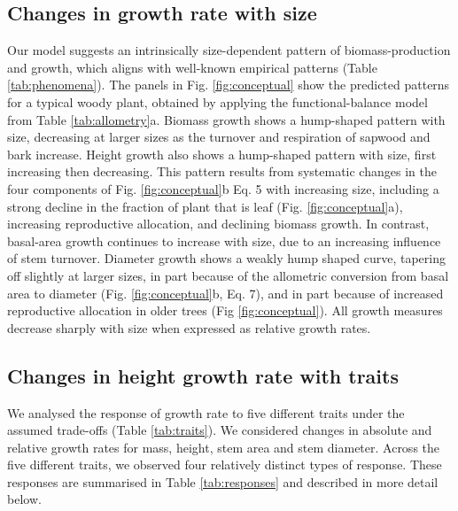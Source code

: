 \documentclass[9pt,twocolumn,twoside,lineno]{pnas-new}
\begin{document}
\subsection*{Changes in growth rate with size}

Our model suggests an intrinsically size-dependent pattern of biomass-production and growth, which aligns with well-known empirical patterns (Table \ref{tab:phenomena}). The panels in Fig. \ref{fig:conceptual} show the predicted patterns for a typical woody plant, obtained by applying the functional-balance model from Table \ref{tab:allometry}a. Biomass growth shows a hump-shaped pattern with size, decreasing at larger sizes as the turnover and respiration of sapwood and bark increase. Height growth also shows a hump-shaped pattern with size, first increasing then decreasing. This pattern results from systematic changes in the four components of Fig. \ref{fig:conceptual}b Eq. {\color{pnasbluetext}5} with increasing size, including a strong decline in the fraction of plant that is leaf (Fig. \ref{fig:conceptual}a), increasing reproductive allocation, and declining biomass growth. In contrast, basal-area growth continues to increase with size, due to an increasing influence of stem turnover. Diameter growth shows a weakly hump shaped curve, tapering off slightly at larger sizes, in part because of the allometric conversion from basal area to diameter (Fig. \ref{fig:conceptual}b, Eq. {\color{pnasbluetext}7}), and in part because of increased reproductive allocation in older trees (Fig \ref{fig:conceptual}). All growth measures decrease sharply with size when expressed as relative growth rates.

\subsection*{Changes in height growth rate with traits}

We analysed the response of growth rate to five different traits under the assumed trade-offs (Table \ref{tab:traits}). We considered changes in absolute and relative growth rates for mass, height, stem area and stem diameter. Across the five different traits, we observed four relatively distinct types of response. These responses are summarised in Table \ref{tab:responses} and described in more detail below.
\end{document}
